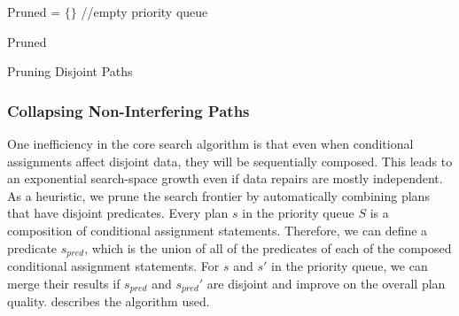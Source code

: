 {
\begin{algorithm}[t]

 Pruned = $\{\}$  //empty priority queue



\Return Pruned
\caption{Pruning Disjoint Paths}
\label{alg:pruning}
\end{algorithm}
}

\subsubsection{Collapsing Non-Interfering Paths}
One inefficiency in the core search algorithm is that even when conditional assignments affect disjoint data, they will be sequentially composed.
This leads to an exponential search-space growth even if data repairs are mostly independent.
As a heuristic, we prune the search frontier by automatically combining plans that have disjoint predicates.
Every plan $s$ in the priority queue $S$ is a composition of conditional assignment statements.
Therefore, we can define a predicate $s_{pred}$, which is the union of all of the predicates of each of the composed conditional assignment statements.
For $s$ and $s'$ in the priority queue, we can merge their results if $s_{pred}$ and $s_{pred}'$ are disjoint and improve on the overall plan quality.
 describes the algorithm used.


